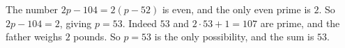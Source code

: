 The number $2p-104=2(p-52)$ is even, and the only even prime is $2$. So $2p-104=2$, giving $p=53$. Indeed $53$ and $2\cdot53+1=107$ are prime, and the father weighs $2$ pounds. So $p=53$ is the only possibility, and the sum is $\boxed{53}$.
